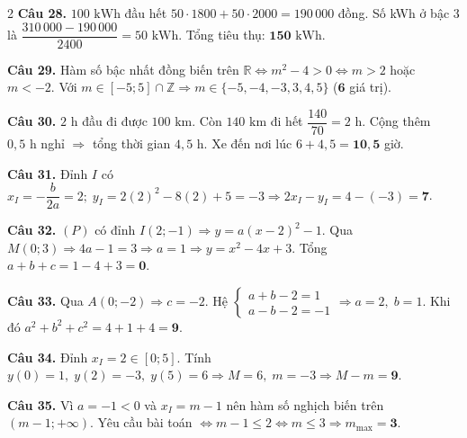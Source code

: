 \documentclass[12pt,a4paper]{article}
\begin{document}
\begin{multicols}{2}
\textbf{Câu 28.} $100\text{ kWh}$ đầu hết $50\cdot 1800 + 50\cdot 2000 = 190\,000$ đồng. Số kWh ở bậc 3 là $\dfrac{310\,000 - 190\,000}{2400} = 50\text{ kWh}$. Tổng tiêu thụ: $\mathbf{150}\text{ kWh}$.\par\vspace{3pt}

\textbf{Câu 29.} Hàm số bậc nhất đồng biến trên $\mathbb{R} \Leftrightarrow m^2 - 4 > 0 \Leftrightarrow m > 2$ hoặc $m < -2$. Với $m \in [-5; 5] \cap \mathbb{Z} \Rightarrow m \in \{-5, -4, -3, 3, 4, 5\}$ ($\mathbf{6}$ giá trị).\par\vspace{3pt}

\textbf{Câu 30.} $2\text{ h}$ đầu đi được $100\text{ km}$. Còn $140\text{ km}$ đi hết $\dfrac{140}{70} = 2\text{ h}$. Cộng thêm $0{,}5\text{ h}$ nghỉ $\Rightarrow$ tổng thời gian $4{,}5\text{ h}$. Xe đến nơi lúc $6 + 4{,}5 = \mathbf{10{,}5}$ giờ.\par\vspace{3pt}

\textbf{Câu 31.} Đỉnh $I$ có $x_I = -\dfrac{b}{2a} = 2;\; y_I = 2(2)^2 - 8(2) + 5 = -3 \Rightarrow 2x_I - y_I = 4 - (-3) = \mathbf{7}$.\par\vspace{3pt}

\textbf{Câu 32.} $(P)$ có đỉnh $I(2; -1) \Rightarrow y = a(x-2)^2 - 1$. Qua $M(0; 3) \Rightarrow 4a - 1 = 3 \Rightarrow a = 1 \Rightarrow y = x^2 - 4x + 3$. Tổng $a + b + c = 1 - 4 + 3 = \mathbf{0}$.\par\vspace{3pt}

\textbf{Câu 33.} Qua $A(0; -2) \Rightarrow c = -2$. Hệ $\begin{cases} a + b - 2 = 1 \\ a - b - 2 = -1 \end{cases} \Rightarrow a = 2,\; b = 1$. Khi đó $a^2 + b^2 + c^2 = 4 + 1 + 4 = \mathbf{9}$.\par\vspace{3pt}

\textbf{Câu 34.} Đỉnh $x_I = 2 \in [0; 5]$. Tính $y(0) = 1,\; y(2) = -3,\; y(5) = 6 \Rightarrow M = 6,\; m = -3 \Rightarrow M - m = \mathbf{9}$.\par\vspace{3pt}

\textbf{Câu 35.} Vì $a = -1 < 0$ và $x_I = m - 1$ nên hàm số nghịch biến trên $(m - 1; +\infty)$. Yêu cầu bài toán $\Leftrightarrow m - 1 \le 2 \Leftrightarrow m \le 3 \Rightarrow m_{\max} = \mathbf{3}$.\par\vspace{3pt}


\end{multicols}
\end{document}
